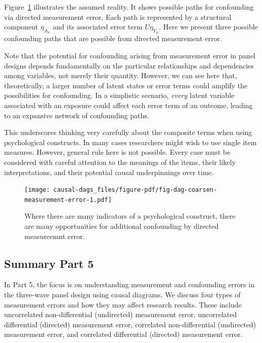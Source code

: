 \documentclass[
  singlecolumn]{report}
\begin{document}
Figure~\ref{fig-dag-coarsen-measurement-error} illustrates the assumed
reality. It shows possible paths for confounding via directed
measurement error. Each path is represented by a structural component
\(\eta_{A_n}\) and its associated error term \(U\eta_{Y_n}\). Here we
present three possible confounding paths that are possible from directed
measurement error.

Note that the potential for confounding arising from measurement error
in panel designs depends fundamentally on the particular relationships
and dependencies among variables, not merely their quantity. However, we
can see here that, theoretically, a larger number of latent states or
error terms could amplify the possibilities for confounding. In a
simplistic scenario, \emph{every} latent variable associated with an
exposure could affect each error term of an outcome, leading to an
expansive network of confounding paths.

This underscores thinking very carefully about the composite terms when
using psychological constructs. In many cases researchers might wish to
use single item measures. However, general rule here is not possible.
Every case must be considered with careful attention to the meanings of
the items, their likely interpretations, and their potential causal
underpinnings over time.

\begin{figure}

{\centering \texttt{[image: causal-dags\_files/figure-pdf/fig-dag-coarsen-measurement-error-1.pdf]}

}

\caption{\label{fig-dag-coarsen-measurement-error}Where there are many
indicators of a psychological construct, there are many opportunities
for additional confounding by directed measureemnt error.}

\end{figure}

\hypertarget{summary-part-5}{%
\subsection{Summary Part 5}\label{summary-part-5}}

In Part 5, the focus is on understanding measurement and confounding
errors in the three-wave panel design using causal diagrams. We discuss
four types of measurement errors and how they may affect research
results. These include uncorrelated non-differential (undirected)
measurement error, uncorrelated differential (directed) measurement
error, correlated non-differential (undirected) measurement error, and
correlated differential (directed) measurement error.
\end{document}
